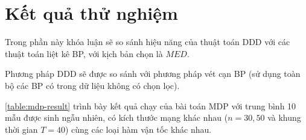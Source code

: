 \documentclass[../main.tex]{subfiles}
\begin{document}
\section{Kết quả thử nghiệm}\label{nhux1eefng-lux1ee3i-uxedch-cux1ee7a-ddd}

Trong phần này khóa luận sẽ so sánh hiệu năng của thuật toán DDD với các thuật
toán liệt kê BP, với kịch bản chọn là \(MED\).

Phương pháp DDD sẽ được so sánh với phương pháp vét cạn BP (sử dụng toàn bộ các BP có trong dữ liệu không có chọn lọc).

\autoref{table:mdp-result} trình bày kết quả chạy của bài toán MDP với trung bình 10 mẫu được sinh ngẫu
nhiên, có kích thước mạng khác nhau (\(n=30,50\) và khung thời gian
\(T=40\)) cùng các loại hàm vận tốc khác nhau.

\end{document}
